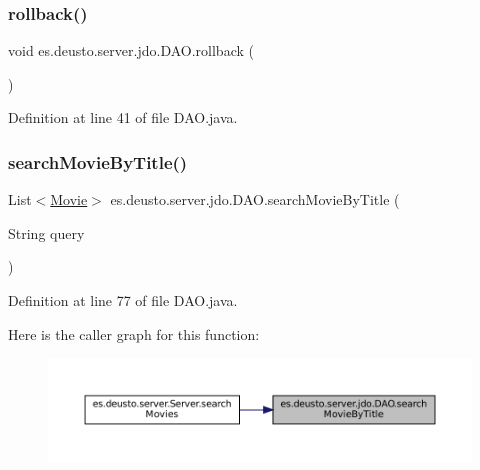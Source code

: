 \subsubsection{\texorpdfstring{rollback()}{rollback()}}
{\footnotesize\ttfamily void es.\+deusto.\+server.\+jdo.\+D\+A\+O.\+rollback (\begin{DoxyParamCaption}{ }\end{DoxyParamCaption})}



Definition at line 41 of file D\+A\+O.\+java.

\mbox{\label{classes_1_1deusto_1_1server_1_1jdo_1_1_d_a_o_a58c4f711e3e60688619f8a065073f4ff}} 
\subsubsection{\texorpdfstring{searchMovieByTitle()}{searchMovieByTitle()}}
{\footnotesize\ttfamily List$<$\mbox{\hyperlink{classes_1_1deusto_1_1server_1_1jdo_1_1_movie}{Movie}}$>$ es.\+deusto.\+server.\+jdo.\+D\+A\+O.\+search\+Movie\+By\+Title (\begin{DoxyParamCaption}\item[{String}]{query }\end{DoxyParamCaption})}



Definition at line 77 of file D\+A\+O.\+java.

Here is the caller graph for this function\+:
\nopagebreak
\begin{figure}[H]
\begin{center}
\leavevmode
\includegraphics[width=350pt]{classes_1_1deusto_1_1server_1_1jdo_1_1_d_a_o_a58c4f711e3e60688619f8a065073f4ff_icgraph}
\end{center}
\end{figure}
\mbox{\label{classes_1_1deusto_1_1server_1_1jdo_1_1_d_a_o_a663255898c034b46536c8a9cd2b247f9}} 
